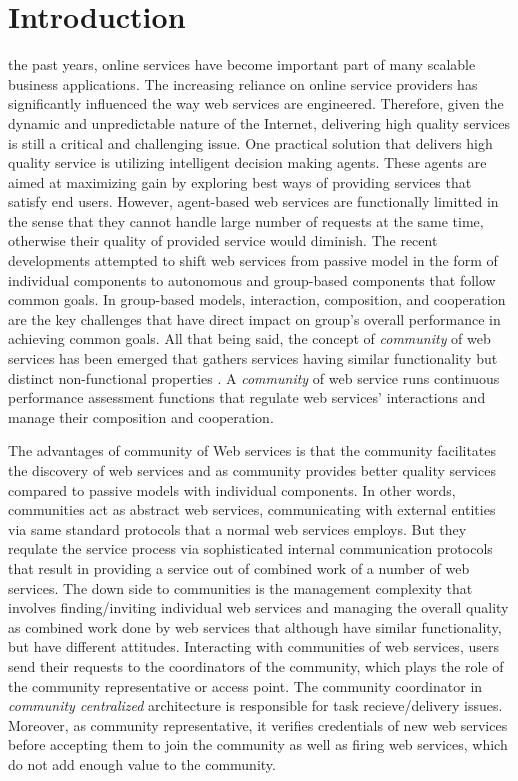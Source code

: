 \documentclass[10pt,journal,cspaper,compsoc]{IEEEtran}
\begin{document}
\section{Introduction}

 the past years, online services have become important part of many scalable business applications. The increasing reliance on online service providers has significantly influenced the way web services are engineered. Therefore, given the dynamic and unpredictable nature of the Internet, delivering high quality services is still a critical and challenging issue. One practical solution that delivers high quality service is utilizing intelligent decision making agents. These agents are aimed at maximizing gain by exploring best ways of providing services that satisfy end users. However, agent-based web services are functionally limitted in the sense that they cannot handle large number of requests at the same time, otherwise their quality of provided service would diminish. The recent developments attempted to shift web services from passive model in the form of individual components to autonomous and group-based components that follow common goals. In group-based models, interaction, composition, and cooperation are the key challenges \cite{ICWS2011-1, SCC2011-1, journals/mags/BaldoniBM10, journals/jcss/CasadoYT13} that have direct impact on group's overall performance in achieving common goals. All that being said, the concept of \emph{community} of web services has been emerged that gathers services having similar functionality but distinct non-functional properties \cite{Zeng:2003:QDW:775152.775211, Paik:2005:TSS:2229263.2230038, Medjahed05adynamic, 10.1109/ARES.2008.7}. A \emph{community} of web service runs continuous performance assessment functions that regulate web services' interactions and manage their composition and cooperation.

The advantages of community of Web services is that the community facilitates the discovery of web services and as community provides better quality services compared to passive models with individual components. In other words, communities act as abstract web services, communicating with external entities via same standard protocols that a normal web services employs. But they requlate the service process via sophisticated internal communication protocols that result in providing a service out of combined work of a number of web services. The down side to communities is the management complexity that involves finding/inviting individual web services and managing the overall quality as combined work done by web services that although have similar functionality, but have different attitudes. Interacting with communities of web services, users send their requests to the coordinators of the community, which plays the role of the community representative or access point. The community coordinator in \emph{community centralized} architecture is responsible for task recieve/delivery issues. Moreover, as community representative, it verifies credentials of new web services before accepting them to join the community as well as firing web services, which do not add enough value to the community.  
\end{document}
